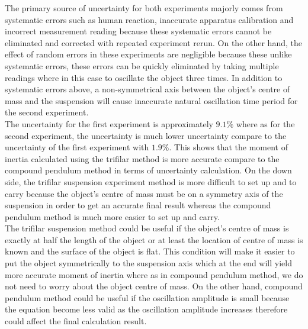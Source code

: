 The primary source of uncertainty for both experiments majorly comes from systematic errors such as human reaction, inaccurate apparatus calibration and incorrect measurement reading because these systematic errors cannot be eliminated and corrected with repeated experiment rerun. On the other hand, the effect of random errors in these experiments are negligible because these unlike systematic errors, these errors can be quickly eliminated by taking multiple readings where in this case to oscillate the object three times. In addition to systematic errors above, a non-symmetrical axis between the object's centre of mass and the suspension will cause inaccurate natural oscillation time period for the second experiment.\\

The uncertainty for the first experiment is approximately $9.1\%$ where as for the second experiment, the uncertainty is much lower uncertainty compare to the uncertainty of the first experiment with $1.9\%$. This shows that the moment of inertia calculated using the trifilar method is more accurate compare to the compound pendulum method in terms of uncertainty calculation. On the down side, the trifilar suspension experiment method is more difficult to set up and to carry because the object's centre of mass must be on a symmetry axis of the suspension in order to get an accurate final result whereas the compound pendulum method is much more easier to set up and carry. \\

The trifilar suspension method could be useful if the object's centre of mass is exactly at half the length of the object or at least the location of centre of mass is known and the surface of the object is flat. This condition will make it easier to put the object symmetrically to the suspension axis which at the end will yield more accurate moment of inertia where as in compound pendulum method, we do not need to worry about the object centre of mass. On the other hand, compound pendulum method could be useful if the oscillation amplitude is small because the equation become less valid as the oscillation amplitude increases therefore could affect the final calculation result. 